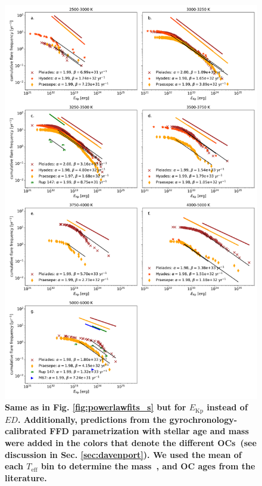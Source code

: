 \documentclass{aa}
\begin{document}
\begin{figure}[Ht!]
    \centering
    \includegraphics[width=14.5cm]{pics/FFDs/SpT_wise_sample_ffd_energy_wheatland.png}
    \caption{\textbf{Same as in Fig. \ref{fig:powerlawfits_s} but for $E_\mathrm{Kp}$  instead of $ED$. Additionally, predictions from the \citet{davenport2019} gyrochronology-calibrated FFD parametrization with stellar age and mass were added in the colors that denote the different OCs~(see discussion in Sec. \ref{sec:davenport}). We used the mean of each $T_\mathrm{eff}$ bin to determine the mass~\citep{pecaut_intrinsic_2013}, and OC ages from the literature.}}          	
    \label{fig:powerlawfits_erg}
\end{figure}
\end{document}
